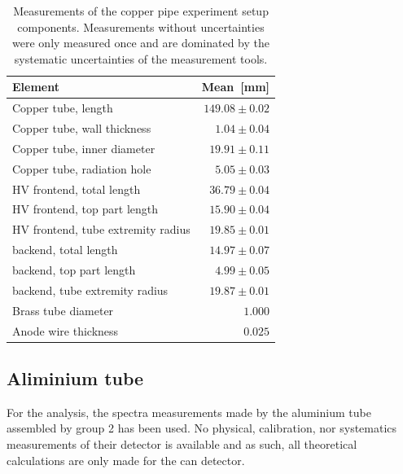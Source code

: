 \begin{table}[htb!]
	\begin{tabularx}{\linewidth}{p{4.5cm}r}
		\textbf{Element} & \textbf{Mean}~{[}mm{]}          \\ \hline
		Copper tube, length                & $149.08 \pm 0.02$ \\
		Copper tube, wall thickness        & $1.04 \pm 0.04$   \\
		Copper tube, inner diameter        & $19.91 \pm 0.11$  \\
		Copper tube, radiation hole        & $5.05 \pm 0.03$   \\
		HV frontend, total length          & $36.79 \pm 0.04$  \\
		HV frontend, top part length       & $15.90 \pm 0.04$  \\
		HV frontend, tube extremity radius & $19.85 \pm 0.01$  \\
		backend, total length              & $14.97 \pm 0.07$  \\
		backend, top part length           & $4.99 \pm 0.05$   \\
		backend, tube extremity radius     & $19.87 \pm 0.01$  \\
		Brass tube diameter                & $1.000$           \\
		Anode wire thickness               & $0.025$           \\ \hline
	\end{tabularx}
\caption{Measurements of the copper pipe experiment setup components. Measurements without uncertainties were only measured once and are dominated by the systematic uncertainties of the measurement tools.}%
\label{Tab:coppercan_sizes}
\end{table}

\subsection{Aliminium tube}
For the analysis, the spectra measurements made by the aluminium tube assembled by group 2 has been used. No physical, calibration, nor systematics measurements of their detector is available and as such, all theoretical calculations are only made for the can detector.